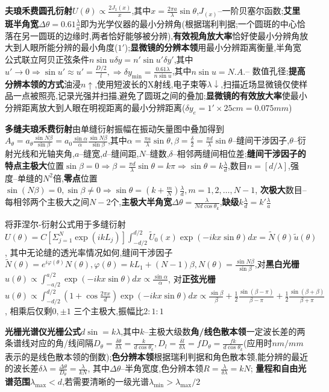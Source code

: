 \documentclass[10pt,a4paper]{article}
\begin{document}
\textbf{夫琅禾费圆孔衍射}$U(\theta)\propto\frac{2J_1(x)}{x}$,其中$x=\frac{2\pi a}{\lambda}\sin\theta$,$J_(x)$--一阶贝塞尔函数;\textbf{艾里斑半角宽}$\Delta\theta=0.61\frac{\lambda}{a}$即为光学仪器的最小分辨角(根据瑞利判据;一个圆斑的中心恰落在另一圆斑的边缘时,两者恰好能够被分辨),\textbf{有效视角放大率}恰好使最小分辨角放大到人眼所能分辨的最小角度($1'$);\textbf{显微镜的分辨本领}用最小分辨距离衡量,半角宽公式联立阿贝正弦条件$n\sin u\delta y=n'\sin u'\delta y'$,其中$u'\to0\Longrightarrow\sin u'\approx u'=\frac{D/2}{l},\Longrightarrow\delta y_{\min}=\frac{0.61\lambda}{n\sin u}$,其中$n\sin u=N.A.$-- 数值孔径;\textbf{提高分辨本领的方式}油浸$n\uparrow$,使用短波长的X射线,电子束等$\lambda\downarrow$,扫描近场显微镜仅使样品一点被照亮,记录光强并扫描,避免了圆斑之间的叠加;\textbf{显微镜的有效放大率}使最小分辨距离放大到人眼在明视距离的最小分辨距离($\delta y_e=1'\times25cm=0.075mm$)

\textbf{多缝夫琅禾费衍射}由单缝衍射振幅在振动矢量图中叠加得到$A_{\theta}=a_{\theta}\frac{\sin N\beta}{\sin\beta}=a_0\frac{\sin\alpha}{\alpha}\frac{\sin N\beta}{\sin\beta}$,其中$\alpha=\frac{\pi a}{\lambda}\sin\theta,\beta=\frac{\delta}{2}=\frac{\pi d}{\lambda}\sin\theta$--缝间干涉因子,$\theta$--衍射光线和光轴夹角,$a$--缝宽,$d$--缝间距,$N$--缝数,$\delta$--相邻两缝间相位差;\textbf{缝间干涉因子的特点主极大}位置$\sin\beta=0\Longrightarrow\beta=\frac{\pi d}{\lambda}\sin\theta=k\pi\Longrightarrow\sin\theta=k\frac{\lambda}{d}$,数目$n=[d/\lambda]$,强度--单缝的$N^2$倍,\textbf{零点}位置$\sin(N\beta)=0,\sin\beta\neq0\Longrightarrow\sin\theta=(k+\frac{m}{N})\frac{\lambda}{d},m=1,2,\ldots,N-1$, \textbf{次极大}数目--每相邻两个主极大之间$N-2$个,\textbf{主极大半角宽}$\Delta\theta=\frac{\lambda}{Nd\cos\theta_k}$,\textbf{缺级}$k\frac{\lambda}{d}=k'\frac{\lambda}{a}$

将菲涅尔-衍射公式用于多缝衍射$U(\theta)=C[\Sigma_{j=1}^N\exp(ikL_j)]\int_{-d/2}^{d/2}\widetilde{U}_0(x)\exp(-ikx\sin\theta)dx=\widetilde{N}(\theta)\widetilde{u}(\theta)$, 其中无论缝的透光率情况如何,缝间干涉因子$\widetilde{N}(\theta)=e^{i\varphi(\theta)}N(\theta),\varphi(\theta)=kL_1+(N-1)\beta,N(\theta)=\frac{\sin N\beta}{\sin\beta}$,对\textbf{黑白光栅}$u(\theta)\propto\int_{-a/2}^{a/2}\exp(-ikx\sin\theta)dx\propto\frac{\sin\alpha}{\alpha}$, 对\textbf{正弦光栅}$u(\theta)\propto\int_{-d/2}^{d/2}(1+\cos\frac{2\pi x}{d})\exp(-ikx\sin\theta)dx\propto\frac{\sin\beta}{\beta}+\frac{1}{2}\frac{\sin(\beta-\pi)}{\beta-\pi}+\frac{1}{2}\frac{\sin(\beta+\beta)}{\beta+\pi}$, 相乘后仅剩$0,\pm1$ 三个主极大,振幅比$2:1:1$

\textbf{光栅光谱仪光栅公式}$d\sin=k\lambda$,其中$k$--主极大级数\textbf{角/线色散本领}一定波长差的两条谱线对应的角/线间隔$D_{\theta}=\frac{\delta\theta}{\delta\lambda}=\frac{k}{d\cos\theta_k},D_l=\frac{\delta l}{\delta\lambda}=fD_{\theta}=\frac{fk}{d\cos\theta_k}$(应用时$nm/mm$表示的是线色散本领的倒数);\textbf{色分辨本领}根据瑞利判据和角色散本领,能分辨的最近的波长差$\delta\lambda=\frac{\Delta\theta}{D_{\theta}}=\frac{\lambda}{kN}$, 其中$\Delta\theta$--半角宽度,色分辨本领$R=\frac{\lambda}{\delta\lambda}=kN$; \textbf{量程和自由光谱范围}$\lambda_{\max}<d$,若需要清晰的一级光谱$\lambda_{\min}>\lambda_{\max}/2$
\end{document}

